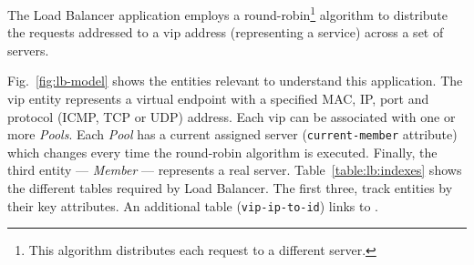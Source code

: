 The Load Balancer application employs a round-robin\footnote{This algorithm distributes each request to a different server.} algorithm to distribute the requests addressed to a \gls{vip} address (representing a service) across a set of servers. 

Fig.~\ref{fig:lb-model} shows the entities relevant to understand this application. 
The \gls{vip} entity represents a virtual endpoint with a specified MAC, IP, port and protocol (ICMP, TCP or UDP) address. 
Each \gls{vip} can be associated with one or more \emph{Pools}. 
Each \emph{Pool} has a current assigned server (\texttt{current-member} attribute) which changes every time the round-robin  algorithm is executed. 
Finally, the third entity --- \emph{Member} --- represents a real server. 
Table~\ref{table:lb:indexes} shows the different tables required by  Load Balancer.
The first three, track entities by their key attributes. An additional table (\texttt{vip-ip-to-id})  links   to . 

\begin{figure}[ht]
\TopFloatBoxes
\begin{floatrow}


\end{floatrow}
\vspace{-10pt}
\end{figure}

